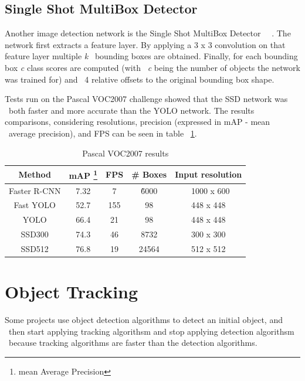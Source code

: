 \subsection{Single Shot MultiBox Detector}
\label{subsec:research-ssd}
Another image detection network is the Single Shot MultiBox Detector \
~\cite{ssd1}.
The network first extracts a feature layer.
By applying a 3 x 3 convolution on that feature layer multiple \textit{k} \
bounding boxes are obtained.
Finally, for each bounding box \textit{c} class scores are computed (with \
\textit{c} being the number of objects the network was trained for) and \
4 relative offsets to the original bounding box shape.

Tests run on the Pascal VOC2007 challenge showed that the SSD network was \
both faster and more accurate than the YOLO network.
The results comparisons, considering resolutions, precision (expressed in mAP - mean \
average precision), and FPS can be seen in table ~\ref{tab:ssd-results}.

\begin{table}[ht]
    \caption{Pascal VOC2007 results}
    \centering
    \begin{tabular}{|c|c|c|c|c|}
        \hline\hline
        Method & mAP \footnote{mean Average Precision} & FPS & \# Boxes & Input resolution  \\
        \hline
        Faster R-CNN & 7.32 & 7 & \~ 6000 & ~1000 x 600 \\
        Fast YOLO & 52.7 & 155 & 98 & 448 x 448 \\
        YOLO & 66.4 & 21 & 98 & 448 x 448 \\
        SSD300 & 74.3 & 46 & 8732 & 300 x 300 \\
        SSD512 & 76.8 & 19 & 24564 & 512 x 512 \\
        \hline\hline
    \end{tabular}
    \label{tab:ssd-results}
\end{table}

%



\section{Object Tracking}
\label{sec:research-tracking}
Some projects use object detection algorithms to detect an initial object, and \
then start applying tracking algorithsm and stop applying detection algorithsm \
because tracking algorithms are faster than the detection algorithms.


